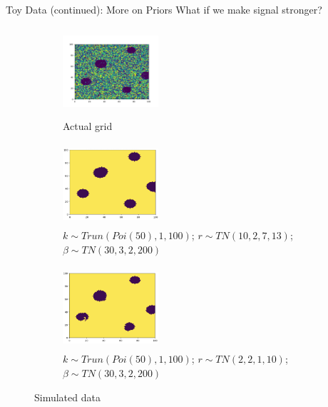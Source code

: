 \documentclass[10pt,mathserif]{beamer}
\begin{document}
\begin{frame}{Toy Data (continued): More on Priors}
What if we make signal stronger?
\begin{figure}[t!]
    \centering
    \begin{subfigure}[t]{0.3\textwidth}
        \centering
        \includegraphics[height=1.3in, width=1.4in]{../BDC_gridactual}
        \caption{Actual grid}
    \end{subfigure}%
    \begin{subfigure}[t]{0.3\textwidth}
        \centering
        \includegraphics[height=1.2in, width=1.4in]{../BDC_grid4_bigradius_ss}
        \caption{ $k \sim Trun(Poi(50), 1, 100)$; $r \sim TN(10, 2, 7, 13)$; $\beta \sim TN(30, 3, 2, 200)$}
    \end{subfigure}%
        \begin{subfigure}[t]{0.3\textwidth}
        \centering
        \includegraphics[height=1.2in, width=1.4in]{../BDC_grid5_smallradius_ss}
        \caption{ $k \sim Trun(Poi(50), 1, 100)$; $r \sim TN(2, 2, 1, 10)$; $\beta \sim TN(30, 3, 2, 200)$}
    \end{subfigure}
    \caption{Simulated data}
\end{figure}
\end{frame}
\end{document}
